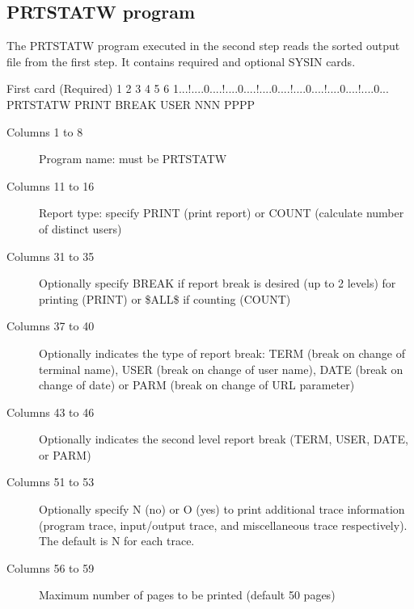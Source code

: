 \documentclass[letterpaper,10pt,english]{sphinxmanual}
\begin{document}
\ignorespaces 

\subsection{PRTSTATW program}
\label{\detokenize{audit_operations_ and_performance:prtstatw-program}}\label{\detokenize{audit_operations_ and_performance:index-90}}
The PRTSTATW program executed in the second step reads the sorted output file from the first step. It contains required and optional SYSIN cards.

\begin{sphinxVerbatim}[commandchars=\\\{\}]
First card (Required)
         1         2         3         4         5         6
1...!....0....!....0....!....0....!....0....!....0....!....0...
PRTSTATW PRINT                BREAK USER          NNN  PPPP
\end{sphinxVerbatim}

\begin{description}
\item[{Columns 1 to 8}] \leavevmode
Program name: must be PRTSTATW

\item[{Columns 11 to 16}] \leavevmode
Report type: specify PRINT (print report) or COUNT (calculate number of distinct users)

\item[{Columns 31 to 35}] \leavevmode
Optionally specify BREAK if report break is desired (up to 2 levels) for printing (PRINT) or \$ALL\$ if counting (COUNT)

\item[{Columns 37 to 40}] \leavevmode
Optionally indicates the type of report break: TERM (break on change of terminal name), USER (break on change of user name), DATE (break on change of date) or PARM (break on change of URL parameter)

\item[{Columns 43 to 46}] \leavevmode
Optionally indicates the second level report break (TERM, USER, DATE, or PARM)

\item[{Columns 51 to 53}] \leavevmode
Optionally specify N (no) or O (yes) to print additional trace information (program trace, input/output trace, and miscellaneous trace respectively). The default is N for each trace.

\item[{Columns 56 to 59}] \leavevmode
Maximum number of pages to be printed (default 50 pages)

\end{description}
\end{document}
